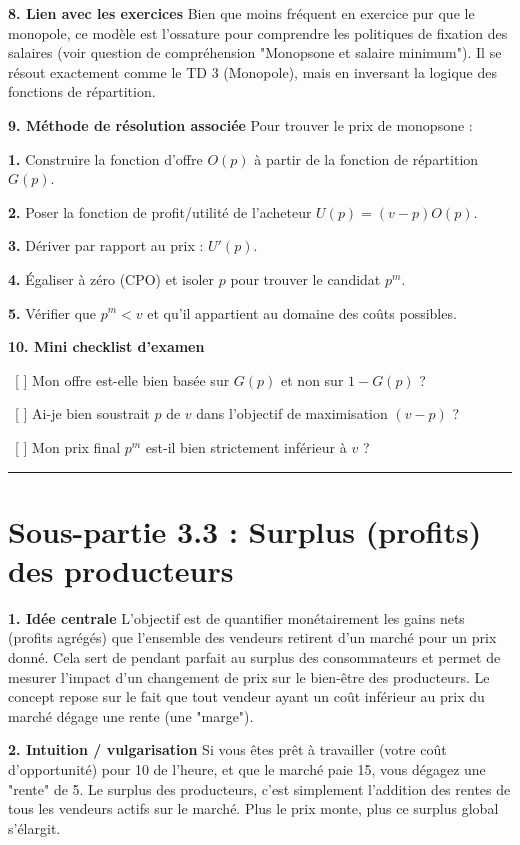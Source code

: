 \documentclass[11pt, a4paper]{report}
\begin{document}
\textbf{8. Lien avec les exercices}
Bien que moins fréquent en exercice pur que le monopole, ce modèle est l'ossature pour comprendre les politiques de fixation des salaires (voir question de compréhension "Monopsone et salaire minimum"). Il se résout exactement comme le TD 3 (Monopole), mais en inversant la logique des fonctions de répartition.

\textbf{9. Méthode de résolution associée}
Pour trouver le prix de monopsone :
\par \textbf{1.} Construire la fonction d'offre $O(p)$ à partir de la fonction de répartition $G(p)$.
\par \textbf{2.} Poser la fonction de profit/utilité de l'acheteur $U(p) = (v-p)O(p)$.
\par \textbf{3.} Dériver par rapport au prix : $U'(p)$.
\par \textbf{4.} Égaliser à zéro (CPO) et isoler $p$ pour trouver le candidat $p^m$.
\par \textbf{5.} Vérifier que $p^m < v$ et qu'il appartient au domaine des coûts possibles.

\textbf{10. Mini checklist d'examen}
\par \textbullet\ [ ] Mon offre est-elle bien basée sur $G(p)$ et non sur $1-G(p)$ ?
\par \textbullet\ [ ] Ai-je bien soustrait $p$ de $v$ dans l'objectif de maximisation $(v-p)$ ?
\par \textbullet\ [ ] Mon prix final $p^m$ est-il bien strictement inférieur à $v$ ?

\vspace{1cm}\hrule\vspace{1cm}

\section{Sous-partie 3.3 : Surplus (profits) des producteurs}

\textbf{1. Idée centrale}
L'objectif est de quantifier monétairement les gains nets (profits agrégés) que l'ensemble des vendeurs retirent d'un marché pour un prix donné. Cela sert de pendant parfait au surplus des consommateurs et permet de mesurer l'impact d'un changement de prix sur le bien-être des producteurs. Le concept repose sur le fait que tout vendeur ayant un coût inférieur au prix du marché dégage une rente (une "marge").

\textbf{2. Intuition / vulgarisation}
Si vous êtes prêt à travailler (votre coût d'opportunité) pour 10\texteuro{} de l'heure, et que le marché paie 15\texteuro{}, vous dégagez une "rente" de 5\texteuro{}. Le surplus des producteurs, c'est simplement l'addition des rentes de tous les vendeurs actifs sur le marché. Plus le prix monte, plus ce surplus global s'élargit.
\end{document}
